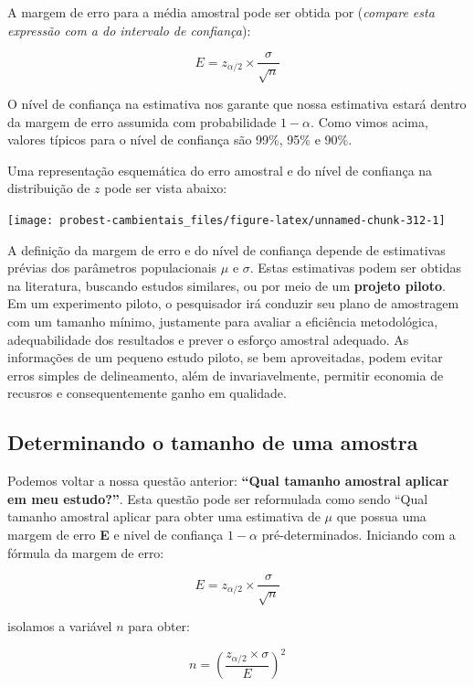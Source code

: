 \documentclass[
]{book}
\begin{document}
A margem de erro para a média amostral pode ser obtida por (\emph{compare esta expressão com a do intervalo de confiança}):

\[E = z_{\alpha/2} \times \frac{\sigma}{\sqrt{n}}\]

O nível de confiança na estimativa nos garante que nossa estimativa estará dentro da margem de erro assumida com probabilidade \(1-\alpha\). Como vimos acima, valores típicos para o nível de confiança são 99\%, 95\% e 90\%.

Uma representação esquemática do erro amostral e do nível de confiança na distribuição de \(z\) pode ser vista abaixo:

\begin{center}\texttt{[image: probest-cambientais\_files/figure-latex/unnamed-chunk-312-1]} \end{center}

A definição da margem de erro e do nível de confiança depende de estimativas prévias dos parâmetros populacionais \(\mu\) e \(\sigma\). Estas estimativas podem ser obtidas na literatura, buscando estudos similares, ou por meio de um \textbf{projeto piloto}. Em um experimento piloto, o pesquisador irá conduzir seu plano de amostragem com um tamanho mínimo, justamente para avaliar a eficiência metodológica, adequabilidade dos resultados e prever o esforço amostral adequado. As informações de um pequeno estudo piloto, se bem aproveitadas, podem evitar erros simples de delineamento, além de invariavelmente, permitir economia de recusros e consequentemente ganho em qualidade.

\hypertarget{determinando-o-tamanho-de-uma-amostra}{%
\subsection{Determinando o tamanho de uma amostra}\label{determinando-o-tamanho-de-uma-amostra}}

Podemos voltar a nossa questão anterior: \textbf{``Qual tamanho amostral aplicar em meu estudo?''}. Esta questão pode ser reformulada como sendo ``Qual tamanho amostral aplicar para obter uma estimativa de \(\mu\) que possua uma margem de erro \textbf{E} e nivel de confiança \(1-\alpha\) pré-determinados. Iniciando com a fórmula da margem de erro:

\[E = z_{\alpha/2} \times \frac{\sigma}{\sqrt{n}}\]

isolamos a variável \(n\) para obter:

\[n = (\frac{ z_{\alpha/2} \times \sigma}{E})^2\]
\end{document}
